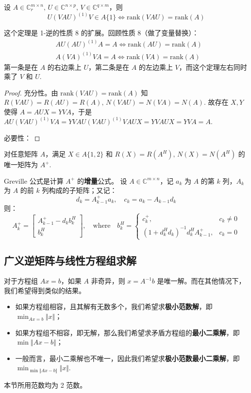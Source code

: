 \begin{theorem}
设 $A\in\mathbb C_r^{m\times n},\,U\in\mathbb C^{n\times p},\,V\in\mathbb C^{q\times m}$，则
\[
    U(VAU)^{(1)}V\in A\{1\}\iff \text{rank}(VAU)=\text{rank}(A)
\]
\end{theorem}
\begin{remark}
这个定理是 1-逆的性质 8 的扩展。回顾性质 8（做了变量替换）：
\begin{align*}
    &AU(AU)^{(1)}A=A\iff\text{rank}(AU)=\text{rank}(A)\\
    &A(VA)^{(1)}VA=A\iff\text{rank}(VA)=\text{rank}(A)
\end{align*}
第一条是在 $A$ 的右边乘上 $U$，第二条是在 $A$ 的左边乘上 $V$，而这个定理左右同时乘了 $V$ 和 $U$.
\end{remark}
\begin{proof}
充分性。由 $\text{rank}(VAU)=\text{rank}(A)$ 知 $R(VAU)=R(AU)=R(A),\,N(VAU)=N(VA)=N(A)$. 故存在 $X,Y$ 使得 $A=AUX=YVA$，于是 $AU(VAU)^{(1)}VA=YVAU(VAU)^{(1)}VAUX=YVAUX=YVA=A$.

必要性：{\color{red}{？？？TODO}}
\end{proof}

\begin{theorem}
对任意矩阵 $A$，满足 $X\in A\{1,2\}$ 和 $R(X)=R(A^H),\,N(X)=N(A^H)$ 的唯一矩阵为 $A^+$.
\end{theorem}

\begin{theorem}
Greville 公式是计算 $A^+$ 的\textbf{增量}公式。
设 $A\in\mathbb C^{m\times n}$，记 $a_k$ 为 $A$ 的第 $k$ 列，$A_k$ 为 $A$ 的前 $k$ 列构成的子矩阵；又记：
\[
    d_k=A^+_{k-1}a_k,\quad c_k=a_k-A_{k-1}d_k
\]
则：
\[
    A^+_k=\begin{bmatrix}A^+_{k-1}-d_kb_k^H\\b_k^H\end{bmatrix},\quad\text{where}\quad b_k^H=\begin{cases}c_k^+,&c_k\neq 0\\(1+d_k^Hd_k)^{-1}d_k^HA^+_{k-1},&c_k=0\end{cases}
\]
\end{theorem}


\subsection{广义逆矩阵与线性方程组求解}

对于方程组 $Ax=b$，如果 $A$ 非奇异，则 $x=A^{-1}b$ 是唯一解。而在其他情况下，我们希望得到类似的结果。
\begin{itemize}
    \item 如果方程组相容，且其解有无数多个，我们希望求\textbf{极小范数解}，即 $\min_{Ax=b}\Vert x\Vert$；
    \item 如果方程组不相容，即无解，那么我们希望求矛盾方程组的\textbf{最小二乘解}，即 $\min \Vert Ax-b\Vert$；
    \item 一般而言，最小二乘解也不唯一，因此我们希望求\textbf{极小范数最小二乘解}，即 $\min_{\min\Vert Ax-b\Vert}\Vert x\Vert$.
\end{itemize}
\begin{com}
本节所用范数均为 2 范数。
\end{com}

